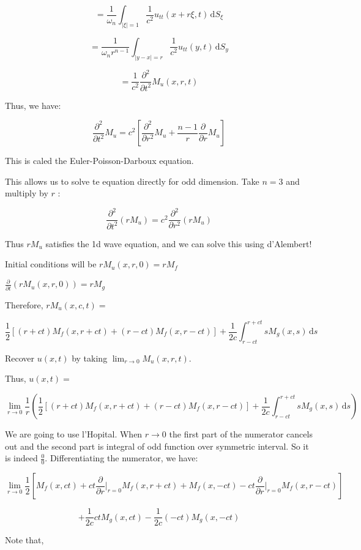 \documentclass{article}
\theoremstyle{definition}
\begin{document}
\[
    = \frac{1}{\omega_n} \int_{\vert \xi  \vert = 1}^{} \frac{1}{c^2} u_{t t} (x+r\xi, t) \,\mathrm{d}S_\xi
\]

\[
    =\frac{1}{\omega_n r^{n-1}} \int_{\vert y - x \vert = r}^{} \frac{1}{c^2} u_{t t}(y,t) \,\mathrm{d}S_y
\]

\[
    =\frac{1}{c^2} \frac{\partial^2}{\partial t^2} M_u(x,r,t)
\]

Thus, we have:

\[
    \frac{\partial^2}{\partial t^2} M_u = c^2 \left[ \frac{\partial^2}{\partial r^2} M_u + \frac{n-1}{r} \frac{\partial}{\partial r} M_u \right] 
\]

This is caled the Euler-Poisson-Darboux equation.

This allows us to solve te equation directly for odd dimension. Take \(n = 3\) and multiply by \(r\) :

\[
    \frac{\partial^2}{\partial t^2} (r M_u) = c^2 \frac{\partial^2}{\partial r^2} (rM_u)
\]

Thus \(r M_u\) satisfies the 1d wave equation, and we can solve this using d'Alembert!

Initial conditions will be \(rM_u(x,r,0)=rM_f\) 

\(\frac{\partial}{\partial t} (rM_u (x,r,0)) = rM_g\) 

Therefore, \(rM_u(x,c,t)=\) 

\[
    \frac{1}{2} [(r+ct) M_f(x,r+ct)+(r-ct)M_f(x,r-ct)] + \frac{1}{2c} \int_{r-ct}^{r+ct} s M_g(x,s) \,\mathrm{d}s
\]

Recover \(u(x,t)\) by taking \(\lim_{r \to 0} M_u(x,r,t)\).

Thus, \(u(x,t)=\) 

\[
    \lim_{r \to 0} \frac{1}{r}\left(\frac{1}{2} \left[ (r+ct) M_f(x,r+ct) + (r-ct) M_f(x,r-ct) \right] + \frac{1}{2c} \int_{r-ct}^{r+ct} s M_g(x,s) \,\mathrm{d}s\right) 
\]

We are going to use l'Hopital. When \(r\to 0\) the first part of the numerator cancels out and the second part is integral of odd function over symmetric interval. So it is indeed \(\frac{0}{0}\). Differentiating the numerator, we have:

\[
    \lim_{r \to 0} \frac{1}{2} \left[ M_f(x,ct) + ct \frac{\partial}{\partial r} \bigg|_{r=0} M_f(x,r+ct) + M_f(x,-ct) - ct \frac{\partial}{\partial r}\bigg|_{r=0} M_f(x,r-ct) \right]
\]

\[
    + \frac{1}{2c} ct M_g(x,ct) - \frac{1}{2c}(-ct) M_g(x,-ct)
\]

Note that,
\end{document}
